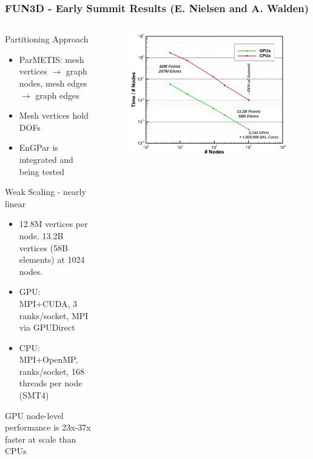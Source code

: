 \documentclass[aspectratio=169]{beamer}
\begin{document}
\begin{frame}
  \frametitle{FUN3D - Early Summit Results (E. Nielsen and A. Walden)}
  \begin{columns}
    \begin{column}{0.5\textwidth}
      Partitioning Approach
      \begin{itemize}
        \item ParMETIS: mesh vertices $\rightarrow$ graph nodes, 
          mesh edges $\rightarrow$ graph edges
        \item Mesh vertices hold DOFs
        \item EnGPar is integrated and being tested
      \end{itemize}
      Weak Scaling - nearly linear
      \begin{itemize}
        \item 12.8M vertices per node. 13.2B vertices (58B elements) at 1024
          nodes.
        \item GPU: MPI+CUDA, 3 ranks/socket, MPI via GPUDirect
        \item CPU: MPI+OpenMP, ranks/socket, 168 threads per node (SMT4)
      \end{itemize}
      GPU node-level performance is 23x-37x faster at scale than CPUs
    \end{column}
    \begin{column}{0.5\textwidth}
      \begin{figure}
        \centering
        \includegraphics[width=\textwidth]{figures/fun3d-summit.png}
      \end{figure}
    \end{column}
  \end{columns}
\end{frame}
\end{document}
